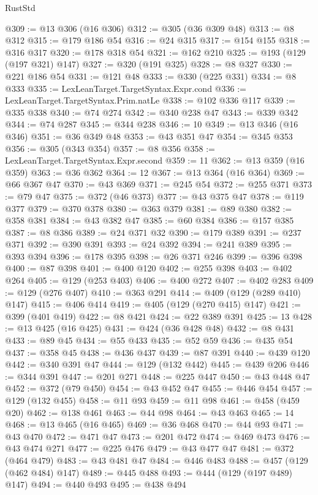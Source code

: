 \begin{lexlean}{RustStd}
\begin{coremodule}
{\begin{coremodule}
{{{{{{{{{{{{{{{{{{{{{{{{{{@309 := @13 @306 (@16 @306)
@312 := @305 (@36 @309 @48)
@313 := @8 @312
@315 := @179 @186 @54
@316 := @24 @315
@317 := @154 @155
@318 := @316 @317
@320 := @178 @318 @54
@321 := @162 @210
@325 := @193 (@129 (@197 @321) @147)
@327 := @320 (@191 @325)
@328 := @8 @327
@330 := @221 @186 @54
@331 := @121 @48
@333 := @330 (@225 @331)
@334 := @8 @333
@335 := LexLeanTarget.TargetSyntax.Expr.cond
@336 := LexLeanTarget.TargetSyntax.Prim.natLe
@338 := @102 @336 @117
@339 := @335 @338
@340 := @74 @274
@342 := @340 @238 @47
@343 := @339 @342
@344 := @74 @287
@345 := @344 @238
@346 := 10
@349 := @13 @346 (@16 @346)
@351 := @36 @349 @48
@353 := @43 @351 @47
@354 := @345 @353
@356 := @305 (@343 @354)
@357 := @8 @356
@358 := LexLeanTarget.TargetSyntax.Expr.second
@359 := 11
@362 := @13 @359 (@16 @359)
@363 := @36 @362
@364 := 12
@367 := @13 @364 (@16 @364)
@369 := @66 @367 @47
@370 := @43 @369
@371 := @245 @54
@372 := @255 @371
@373 := @79 @47
@375 := @372 (@46 @373)
@377 := @43 @375 @47
@378 := @119 @377
@379 := @370 @378
@380 := @363 @379
@381 := @89 @380
@382 := @358 @381
@384 := @43 @382 @47
@385 := @60 @384
@386 := @157 @385
@387 := @8 @386
@389 := @24 @371 @32
@390 := @179 @389
@391 := @237 @371
@392 := @390 @391
@393 := @24 @392
@394 := @241 @389
@395 := @393 @394
@396 := @178 @395
@398 := @26 @371 @246
@399 := @396 @398
@400 := @87 @398
@401 := @400 @120
@402 := @255 @398
@403 := @402 @264
@405 := @129 (@253 @403)
@406 := @400 @272
@407 := @402 @283
@409 := @129 (@276 @407)
@410 := @363 @291
@414 := @409 (@129 (@289 @410) @147)
@415 := @406 @414
@419 := @405 (@129 (@270 @415) @147)
@421 := @399 (@401 @419)
@422 := @8 @421
@424 := @22 @389 @391
@425 := 13
@428 := @13 @425 (@16 @425)
@431 := @424 (@36 @428 @48)
@432 := @8 @431
@433 := @89 @45
@434 := @55 @433
@435 := @52 @59
@436 := @435 @54
@437 := @358 @45
@438 := @436 @437
@439 := @87 @391
@440 := @439 @120
@442 := @340 @391 @47
@444 := @129 (@132 @442)
@445 := @439 @206
@446 := @344 @391
@447 := @201 @271
@448 := @225 @447
@450 := @43 @448 @47
@452 := @372 (@79 @450)
@454 := @43 @452 @47
@455 := @446 @454
@457 := @129 (@132 @455)
@458 := @11 @93
@459 := @11 @98
@461 := @458 (@459 @20)
@462 := @138 @461
@463 := @44 @98
@464 := @43 @463
@465 := 14
@468 := @13 @465 (@16 @465)
@469 := @36 @468
@470 := @44 @93
@471 := @43 @470
@472 := @471 @47
@473 := @201 @472
@474 := @469 @473
@476 := @43 @474 @271
@477 := @225 @476
@479 := @43 @477 @47
@481 := @372 (@464 @479)
@483 := @43 @481 @47
@484 := @446 @483
@488 := @457 (@129 (@462 @484) @147)
@489 := @445 @488
@493 := @444 (@129 (@197 @489) @147)
@494 := @440 @493
@495 := @438 @494
}}}}}}}}}}}}}}}}}}}}}}}}}}
\end{coremodule}}
\end{coremodule}
\end{lexlean}
